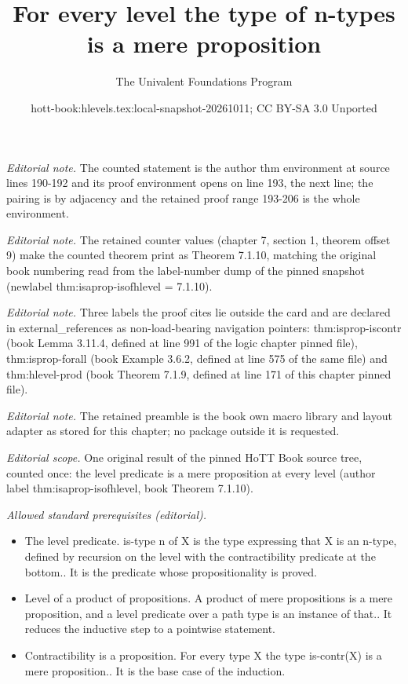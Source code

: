 \documentclass[10pt,a4paper]{article}
\title{For every level the type of n-types is a mere proposition}
\author{The Univalent Foundations Program}
\date{hott-book:hlevels.tex:local-snapshot-20261011; CC BY-SA 3.0 Unported}
\newcounter{chapter}
\theoremstyle{definition}
\theoremstyle{remark}
\numberwithin{equation}{section}
\begin{document}
\maketitle
\setcounter{chapter}{7}
\setcounter{section}{1}
\setcounter{thm}{9}
\noindent\textit{Editorial note.} The counted statement is the author thm environment at source lines 190-192 and its proof environment opens on line 193, the next line; the pairing is by adjacency and the retained proof range 193-206 is the whole environment.\par\medskip
\noindent\textit{Editorial note.} The retained counter values (chapter 7, section 1, theorem offset 9) make the counted theorem print as Theorem 7.1.10, matching the original book numbering read from the label-number dump of the pinned snapshot (newlabel thm:isaprop-isofhlevel = 7.1.10).\par\medskip
\noindent\textit{Editorial note.} Three labels the proof cites lie outside the card and are declared in external\_references as non-load-bearing navigation pointers: thm:isprop-iscontr (book Lemma 3.11.4, defined at line 991 of the logic chapter pinned file), thm:isprop-forall (book Example 3.6.2, defined at line 575 of the same file) and thm:hlevel-prod (book Theorem 7.1.9, defined at line 171 of this chapter pinned file).\par\medskip
\noindent\textit{Editorial note.} The retained preamble is the book own macro library and layout adapter as stored for this chapter; no package outside it is requested.\par\medskip
\noindent\textit{Editorial scope.} One original result of the pinned HoTT Book source tree, counted once: the level predicate is a mere proposition at every level (author label thm:isaprop-isofhlevel, book Theorem 7.1.10).\par\medskip
\noindent\textit{Allowed standard prerequisites (editorial).}\begin{itemize}
\item The level predicate. is-type n of X is the type expressing that X is an n-type, defined by recursion on the level with the contractibility predicate at the bottom.. It is the predicate whose propositionality is proved.
\item Level of a product of propositions. A product of mere propositions is a mere proposition, and a level predicate over a path type is an instance of that.. It reduces the inductive step to a pointwise statement.
\item Contractibility is a proposition. For every type X the type is-contr(X) is a mere proposition.. It is the base case of the induction.
\end{itemize}\medskip
\end{document}
